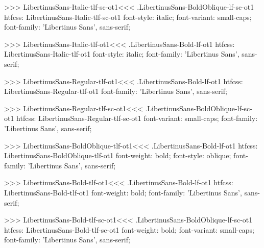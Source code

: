 >>>
\<LibertinusSans-Italic-tlf-sc-ot1\><<<
.LibertinusSans-BoldOblique-lf-sc-ot1
htfcss:  LibertinusSans-Italic-tlf-sc-ot1  font-style: italic; font-variant: small-caps; font-family: 'Libertinus Sans', sans-serif;

>>>
\<LibertinusSans-Italic-tlf-ot1\><<<
.LibertinusSans-Bold-lf-ot1
htfcss:  LibertinusSans-Italic-tlf-ot1  font-style: italic; font-family: 'Libertinus Sans', sans-serif;

>>>
\<LibertinusSans-Regular-tlf-ot1\><<<
.LibertinusSans-Bold-lf-ot1
htfcss:  LibertinusSans-Regular-tlf-ot1  font-family: 'Libertinus Sans', sans-serif;

>>>
\<LibertinusSans-Regular-tlf-sc-ot1\><<<
.LibertinusSans-BoldOblique-lf-sc-ot1
htfcss:  LibertinusSans-Regular-tlf-sc-ot1  font-variant: small-caps; font-family: 'Libertinus Sans', sans-serif;

>>>
\<LibertinusSans-BoldOblique-tlf-ot1\><<<
.LibertinusSans-Bold-lf-ot1
htfcss:  LibertinusSans-BoldOblique-tlf-ot1  font-weight: bold; font-style: oblique; font-family: 'Libertinus Sans', sans-serif;

>>>
\<LibertinusSans-Bold-tlf-ot1\><<<
.LibertinusSans-Bold-lf-ot1
htfcss:  LibertinusSans-Bold-tlf-ot1  font-weight: bold; font-family: 'Libertinus Sans', sans-serif;

>>>
\<LibertinusSans-Bold-tlf-sc-ot1\><<<
.LibertinusSans-BoldOblique-lf-sc-ot1
htfcss:  LibertinusSans-Bold-tlf-sc-ot1  font-weight: bold; font-variant: small-caps; font-family: 'Libertinus Sans', sans-serif;

